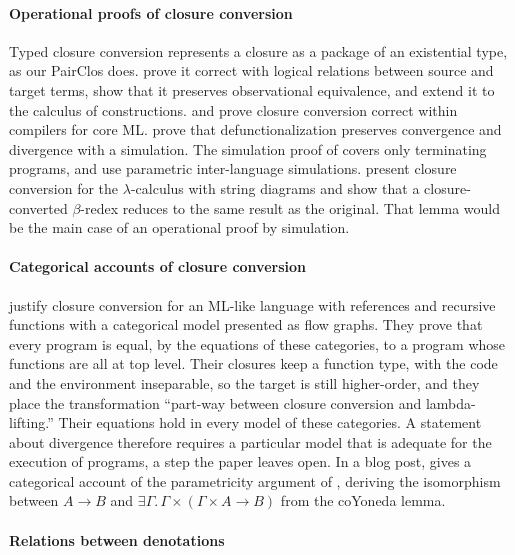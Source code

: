 \paragraph{Operational proofs of closure conversion}

Typed closure conversion represents a closure as a package of an
existential type, as our PairClos does. \citet{Minamide:1996ys} prove
it correct with logical relations between source and target terms,
\citet{Ahmed:2008aa} show that it preserves observational equivalence,
and \citet{Bowman:2018aa} extend it to the calculus of constructions.
\citet{Dargaye:2009aa} and \citet{Hur:2011aa} prove closure conversion
correct within compilers for core ML.  \citet{Pottier:2006aa} prove
that defunctionalization preserves convergence and divergence with a
simulation. The simulation proof of \citet{Wand:1994aa} covers only
terminating programs, and \citet{Neis:2015aa} use parametric
inter-language simulations. \citet{Ghica:2027aa} present closure
conversion for the $\lambda$-calculus with string diagrams and show
that a closure-converted $\beta$-redex reduces to the same result as
the original. That lemma would be the main case of an operational
proof by simulation.

\paragraph{Categorical accounts of closure conversion}

\citet{Schweimeier:1999aa} justify closure conversion for an ML-like
language with references and recursive functions with a categorical
model presented as flow graphs. They prove that every program is
equal, by the equations of these categories, to a program whose
functions are all at top level. Their closures keep a function type,
with the code and the environment inseparable, so the target is still
higher-order, and they place the transformation ``part-way between
closure conversion and lambda-lifting.'' Their equations hold in every
model of these categories. A statement about divergence therefore
requires a particular model that is adequate for the execution of
programs, a step the paper leaves open. In a blog post,
\citet{New:2017aa} gives a categorical account of the parametricity
argument of \citet{Ahmed:2008aa}, deriving the isomorphism between $A
\to B$ and $\exists \Gamma.\, \Gamma \times (\Gamma \times A \to B)$
from the coYoneda lemma.

\paragraph{Relations between denotations}

